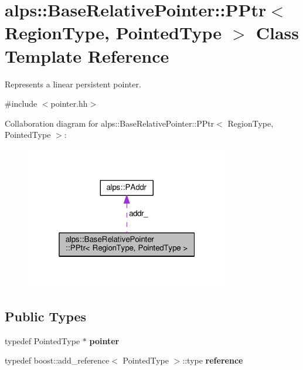 \hypertarget{classalps_1_1BaseRelativePointer_1_1PPtr}{}\section{alps\+:\+:Base\+Relative\+Pointer\+:\+:P\+Ptr$<$ Region\+Type, Pointed\+Type $>$ Class Template Reference}
\label{classalps_1_1BaseRelativePointer_1_1PPtr}


Represents a linear persistent pointer.  




{\ttfamily \#include $<$pointer.\+hh$>$}



Collaboration diagram for alps\+:\+:Base\+Relative\+Pointer\+:\+:P\+Ptr$<$ Region\+Type, Pointed\+Type $>$\+:
\nopagebreak
\begin{figure}[H]
\begin{center}
\leavevmode
\includegraphics[width=253pt]{classalps_1_1BaseRelativePointer_1_1PPtr__coll__graph}
\end{center}
\end{figure}
\subsection*{Public Types}
\begin{DoxyCompactItemize}
\item 
typedef Pointed\+Type $\ast$ {\bfseries pointer}\hypertarget{classalps_1_1BaseRelativePointer_1_1PPtr_a5f717b3a58c7c552bf047eea9f22fb6c}{}\label{classalps_1_1BaseRelativePointer_1_1PPtr_a5f717b3a58c7c552bf047eea9f22fb6c}

\item 
typedef boost\+::add\+\_\+reference$<$ Pointed\+Type $>$\+::type {\bfseries reference}\hypertarget{classalps_1_1BaseRelativePointer_1_1PPtr_a88f51b3310a8e4422bf1391f1a88d8d9}{}\label{classalps_1_1BaseRelativePointer_1_1PPtr_a88f51b3310a8e4422bf1391f1a88d8d9}

\end{DoxyCompactItemize}
